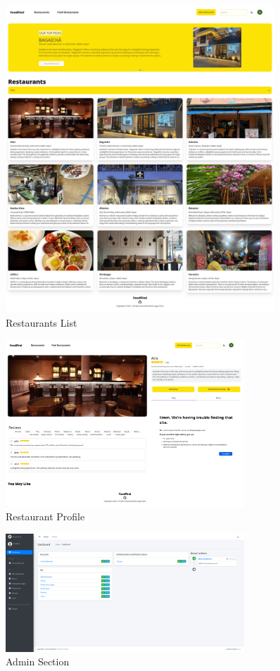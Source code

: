 \documentclass[12pt, a4paper, oneside]{article}
\begin{document}
\begin{figure}[h]
	\includegraphics[width=0.9\textwidth]{restro}
	\centering
	\caption{Restaurants List}
	\label{fig:Restaurant}
\end{figure}

\vspace{7mm}
\begin{figure}[h]
	\includegraphics[width=0.8\textwidth]{profile}
	\centering
	\caption{Restaurant Profile}
	\label{fig:Profile}
\end{figure}

\vspace{7mm}
\begin{figure}[h]
	\includegraphics[width=0.8\textwidth]{admin}
	\centering
	\caption{Admin Section}
	\label{fig:Admin Section}
\end{figure}
\end{document}
